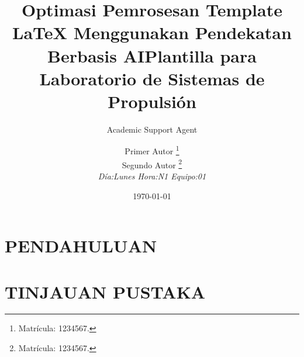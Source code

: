 \documentclass{aiaa-LSP}
\title{Optimasi Pemrosesan Template LaTeX Menggunakan Pendekatan Berbasis AI}
\author{Academic Support Agent}
\date{\today}
\begin{document}
\maketitle

\begin{abstract}

\end{abstract}

\chapter{PENDAHULUAN}


\chapter{TINJAUAN PUSTAKA}


\usepackage{graphicx}
\usepackage{epstopdf}
\usepackage[spanish]{babel}
\usepackage[utf8]{inputenc}
\graphicspath{{Figuras/}}
	\addto{}
\usepackage {hyperref}

 \title{Plantilla para Laboratorio de Sistemas de Propulsión}

 \author{
  Primer Autor%
    \thanks{Matrícula: 1234567.}
  \\ Segundo Autor%
   \thanks{Matrícula: 1234567.}\\
  {\normalsize\itshape
  Día:Lunes Hora:N1  Equipo:01}
 }


 \newcommand{\eqnref}[1]{(\ref{#1})}
 \newcommand{\class}[1]{\texttt{#1}}
 \newcommand{\package}[1]{\texttt{#1}}
 \newcommand{\file}[1]{\texttt{#1}}
 \newcommand{\BibTeX}{\textsc{Bib}\TeX}
\end{document}
